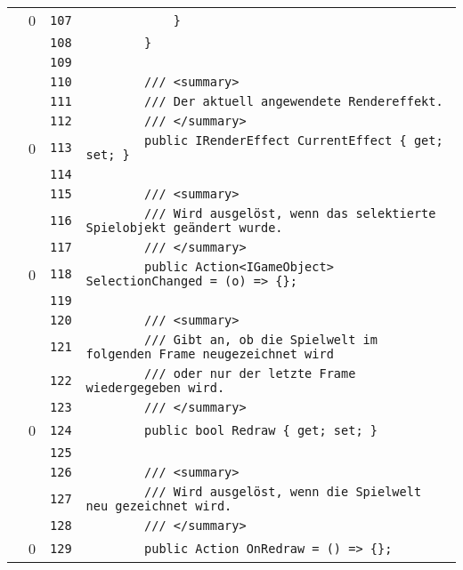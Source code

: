\documentclass[a4paper,10pt]{article}
\begin{document}
\begin{longtable}[l]{lrrl}
\cellcolor{red} & 0 & \verb~107~ & \verb~            }~\\
\cellcolor{gray} &  & \verb~108~ & \verb~        }~\\
\cellcolor{gray} &  & \verb~109~ & \verb~~\\
\cellcolor{gray} &  & \verb~110~ & \verb~        /// <summary>~\\
\cellcolor{gray} &  & \verb~111~ & \verb~        /// Der aktuell angewendete Rendereffekt.~\\
\cellcolor{gray} &  & \verb~112~ & \verb~        /// </summary>~\\
\cellcolor{red} & 0 & \verb~113~ & \verb~        public IRenderEffect CurrentEffect { get; set; }~\\
\cellcolor{gray} &  & \verb~114~ & \verb~~\\
\cellcolor{gray} &  & \verb~115~ & \verb~        /// <summary>~\\
\cellcolor{gray} &  & \verb~116~ & \verb~        /// Wird ausgelöst, wenn das selektierte Spielobjekt geändert wurde.~\\
\cellcolor{gray} &  & \verb~117~ & \verb~        /// </summary>~\\
\cellcolor{red} & 0 & \verb~118~ & \verb~        public Action<IGameObject> SelectionChanged = (o) => {};~\\
\cellcolor{gray} &  & \verb~119~ & \verb~~\\
\cellcolor{gray} &  & \verb~120~ & \verb~        /// <summary>~\\
\cellcolor{gray} &  & \verb~121~ & \verb~        /// Gibt an, ob die Spielwelt im folgenden Frame neugezeichnet wird~\\
\cellcolor{gray} &  & \verb~122~ & \verb~        /// oder nur der letzte Frame wiedergegeben wird.~\\
\cellcolor{gray} &  & \verb~123~ & \verb~        /// </summary>~\\
\cellcolor{red} & 0 & \verb~124~ & \verb~        public bool Redraw { get; set; }~\\
\cellcolor{gray} &  & \verb~125~ & \verb~~\\
\cellcolor{gray} &  & \verb~126~ & \verb~        /// <summary>~\\
\cellcolor{gray} &  & \verb~127~ & \verb~        /// Wird ausgelöst, wenn die Spielwelt neu gezeichnet wird.~\\
\cellcolor{gray} &  & \verb~128~ & \verb~        /// </summary>~\\
\cellcolor{red} & 0 & \verb~129~ & \verb~        public Action OnRedraw = () => {};~\\

\end{longtable}
\end{document}
